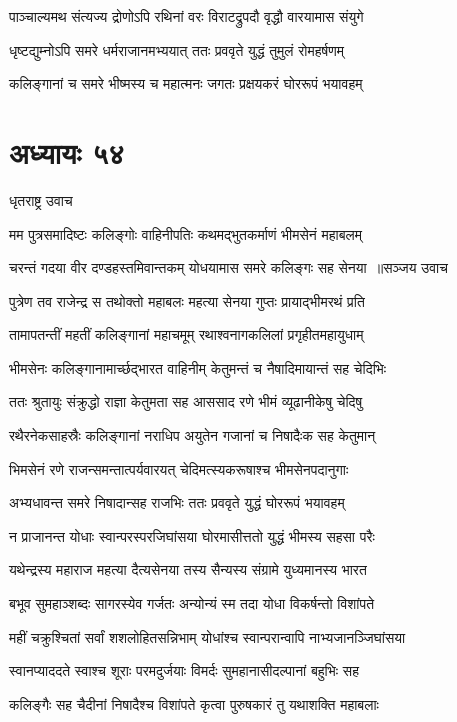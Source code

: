 \twolineshloka
{पाञ्चाल्यमथ संत्यज्य द्रोणोऽपि रथिनां वरः}
{विराटद्रुपदौ वृद्धौ वारयामास संयुगे}


\twolineshloka
{धृष्टद्युम्नोऽपि समरे धर्मराजानमभ्ययात्}
{ततः प्रववृते युद्धं तुमुलं रोमहर्षणम्}


\twolineshloka
{कलिङ्गानां च समरे भीष्मस्य च महात्मनः}
{जगतः प्रक्षयकरं घोररूपं भयावहम्}


\chapter{अध्यायः ५४}
\twolineshloka
{धृतराष्ट्र उवाच}
{}


\twolineshloka
{मम पुत्रसमादिष्टः कलिङ्गोः वाहिनीपतिः}
{कथमद्भुतकर्माणं भीमसेनं महाबलम्}


\threelineshloka
{चरन्तं गदया वीर दण्डहस्तमिवान्तकम्}
{योधयामास समरे कलिङ्गः सह सेनया ॥सञ्जय उवाच}
{}


\twolineshloka
{पुत्रेण तव राजेन्द्र स तथोक्तो महाबलः}
{महत्या सेनया गुप्तः प्रायाद्भीमरथं प्रति}


\twolineshloka
{तामापतन्तीं महतीं कलिङ्गानां महाचमूम्}
{रथाश्वनागकलिलां प्रगृहीतमहायुधाम्}


\twolineshloka
{भीमसेनः कलिङ्गानामार्च्छद्भारत वाहिनीम्}
{केतुमन्तं च नैषादिमायान्तं सह चेदिभिः}


\twolineshloka
{ततः श्रुतायुः संक्रुद्धो राज्ञा केतुमता सह}
{आससाद रणे भीमं व्यूढानीकेषु चेदिषु}


\twolineshloka
{रथैरनेकसाहस्रैः कलिङ्गानां नराधिप}
{अयुतेन गजानां च निषादैःक सह केतुमान्}


\twolineshloka
{भिमसेनं रणे राजन्समन्तात्पर्यवारयत्}
{चेदिमत्स्यकरूषाश्च भीमसेनपदानुगाः}


\twolineshloka
{अभ्यधावन्त समरे निषादान्सह राजभिः}
{ततः प्रववृते युद्धं घोररूपं भयावहम्}


\twolineshloka
{न प्राजानन्त योधाः स्वान्परस्परजिघांसया}
{घोरमासीत्ततो युद्धं भीमस्य सहसा परैः}


\twolineshloka
{यथेन्द्रस्य महाराज महत्या दैत्यसेनया}
{तस्य सैन्यस्य संग्रामे युध्यमानस्य भारत}


\twolineshloka
{बभूव सुमहाञ्शब्दः सागरस्येव गर्जतः}
{अन्योन्यं स्म तदा योधा विकर्षन्तो विशांपते}


\twolineshloka
{महीं चक्रुश्चितां सर्वां शशलोहितसन्निभाम्}
{योधांश्च स्वान्परान्वापि नाभ्यजानञ्जिघांसया}


\twolineshloka
{स्वानप्याददते स्वाश्च शूराः परमदुर्जयाः}
{विमर्दः सुमहानासीदल्पानां बहुभिः सह}


\twolineshloka
{कलिङ्गैः सह चैदीनां निषादैश्च विशांपते}
{कृत्वा पुरुषकारं तु यथाशक्ति महाबलाः}


